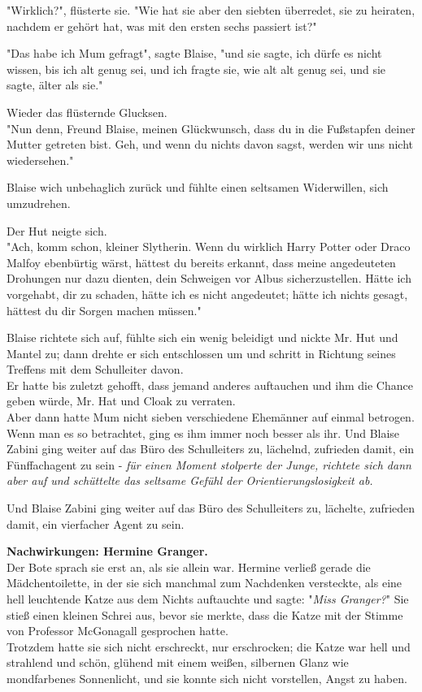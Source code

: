 {"Wirklich?", flüsterte sie. "Wie hat sie aber den siebten überredet, sie zu heiraten, nachdem er gehört hat, was mit den ersten sechs passiert ist?"

"Das habe ich Mum gefragt", sagte Blaise, "und sie sagte, ich dürfe es nicht wissen, bis ich alt genug sei, und ich fragte sie, wie alt alt genug sei, und sie sagte, älter als sie."

Wieder das flüsternde Glucksen.\\ "Nun denn, Freund Blaise, meinen Glückwunsch, dass du in die Fußstapfen deiner Mutter getreten bist. Geh, und wenn du nichts davon sagst, werden wir uns nicht wiedersehen."

Blaise wich unbehaglich zurück und fühlte einen seltsamen Widerwillen, sich umzudrehen.

Der Hut neigte sich.\\ "Ach, komm schon, kleiner Slytherin. Wenn du wirklich Harry Potter oder Draco Malfoy ebenbürtig wärst, hättest du bereits erkannt, dass meine angedeuteten Drohungen nur dazu dienten, dein Schweigen vor Albus sicherzustellen. Hätte ich vorgehabt, dir zu schaden, hätte ich es nicht angedeutet; hätte ich nichts gesagt, hättest du dir Sorgen machen müssen."

Blaise richtete sich auf, fühlte sich ein wenig beleidigt und nickte Mr. Hut und Mantel zu; dann drehte er sich entschlossen um und schritt in Richtung seines Treffens mit dem Schulleiter davon.\\ Er hatte bis zuletzt gehofft, dass jemand anderes auftauchen und ihm die Chance geben würde, Mr. Hat und Cloak zu verraten.\\ Aber dann hatte Mum nicht sieben verschiedene Ehemänner auf einmal betrogen. Wenn man es so betrachtet, ging es ihm immer noch besser als ihr. Und Blaise Zabini ging weiter auf das Büro des Schulleiters zu, lächelnd, zufrieden damit, ein Fünffachagent zu sein - \emph{für einen Moment stolperte der Junge, richtete sich dann aber auf und schüttelte das seltsame Gefühl der Orientierungslosigkeit ab.}

Und Blaise Zabini ging weiter auf das Büro des Schulleiters zu, lächelte, zufrieden damit, ein vierfacher Agent zu sein.

\textbf{Nachwirkungen: Hermine Granger.}\\ Der Bote sprach sie erst an, als sie allein war. Hermine verließ gerade die Mädchentoilette, in der sie sich manchmal zum Nachdenken versteckte, als eine hell leuchtende Katze aus dem Nichts auftauchte und sagte: "\emph{Miss Granger?}" Sie stieß einen kleinen Schrei aus, bevor sie merkte, dass die Katze mit der Stimme von Professor McGonagall gesprochen hatte.\\ Trotzdem hatte sie sich nicht erschreckt, nur erschrocken; die Katze war hell und strahlend und schön, glühend mit einem weißen, silbernen Glanz wie mondfarbenes Sonnenlicht, und sie konnte sich nicht vorstellen, Angst zu haben.

}
